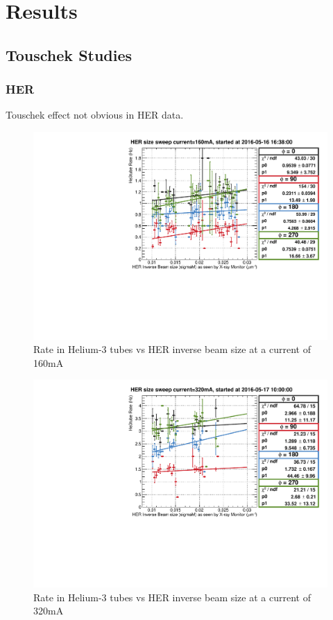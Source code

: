 \chapter{Results}
\label{chap:Results}



\section{Touschek Studies}

\subsection{HER}

	Touschek effect not obvious in HER data.


\begin{figure}[htb]
	\centerfloat
		\includegraphics[trim={0 0 0 0.75cm},clip, scale=0.6]{images/2006}
	\caption{Rate in Helium-3 tubes vs HER inverse beam size at a current of 160mA}	
	\label{fig:TousHER2006}
\end{figure}

\begin{figure}[htb]
	\centerfloat
		\includegraphics[trim={0 0 0 0.75cm},clip, scale=0.6]{images/2007}
	\caption{Rate in Helium-3 tubes vs HER inverse beam size at a current of 320mA}	
	\label{fig:TousHER2007}
\end{figure}

